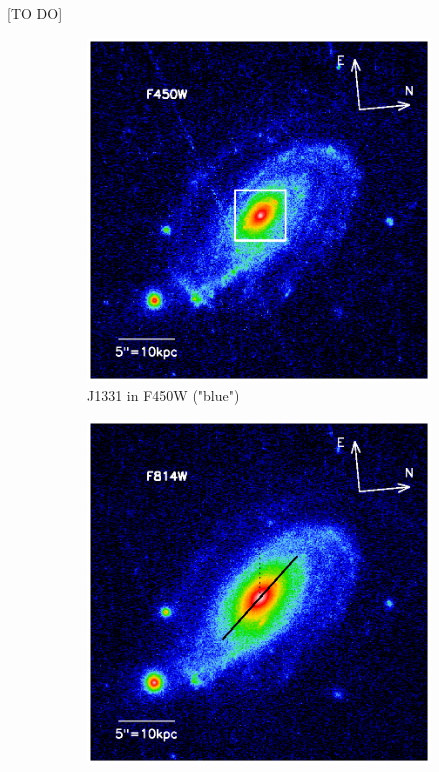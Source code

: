[TO DO]




\begin{figure}
\centering
\begin{subfigure}{.5\textwidth}
  \centering
  \includegraphics[width=.9\linewidth]{fig/first_glimpse_450.ps}
  \caption{J1331 in F450W ("blue")}
  \label{fig:F450W}
\end{subfigure}%
\begin{subfigure}{.5\textwidth}
  \centering
  \includegraphics[width=.9\linewidth]{fig/first_glimpse_814.ps}

\end{subfigure}
\end{figure}
